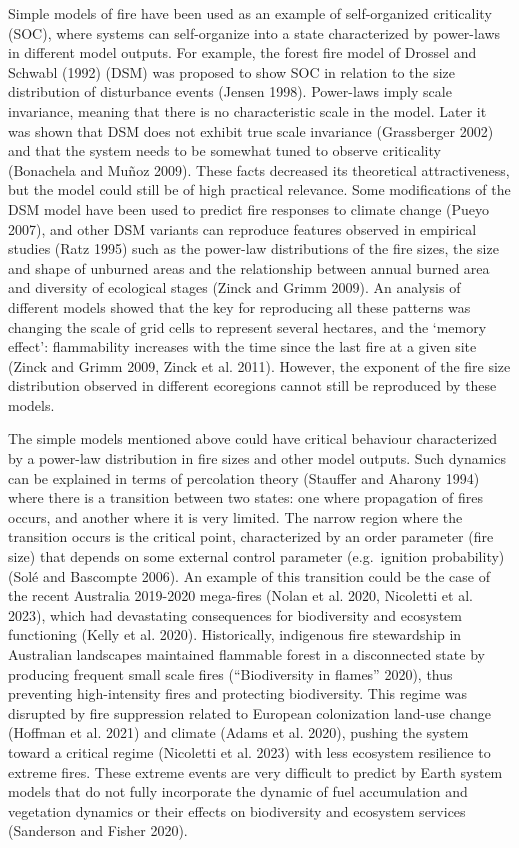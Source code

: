\documentclass[
]{article}
\begin{document}
Simple models of fire have been used as an example of self-organized
criticality (SOC), where systems can self-organize into a state
characterized by power-laws in different model outputs. For example, the
forest fire model of Drossel and Schwabl (1992) (DSM) was proposed to
show SOC in relation to the size distribution of disturbance events
(Jensen 1998). Power-laws imply scale invariance, meaning that there is
no characteristic scale in the model. Later it was shown that DSM does
not exhibit true scale invariance (Grassberger 2002) and that the system
needs to be somewhat tuned to observe criticality (Bonachela and Muñoz
2009). These facts decreased its theoretical attractiveness, but the
model could still be of high practical relevance. Some modifications of
the DSM model have been used to predict fire responses to climate change
(Pueyo 2007), and other DSM variants can reproduce features observed in
empirical studies (Ratz 1995) such as the power-law distributions of the
fire sizes, the size and shape of unburned areas and the relationship
between annual burned area and diversity of ecological stages (Zinck and
Grimm 2009). An analysis of different models showed that the key for
reproducing all these patterns was changing the scale of grid cells to
represent several hectares, and the `memory effect': flammability
increases with the time since the last fire at a given site (Zinck and
Grimm 2009, Zinck et al. 2011). However, the exponent of the fire size
distribution observed in different ecoregions cannot still be reproduced
by these models.

The simple models mentioned above could have critical behaviour
characterized by a power-law distribution in fire sizes and other model
outputs. Such dynamics can be explained in terms of percolation theory
(Stauffer and Aharony 1994) where there is a transition between two
states: one where propagation of fires occurs, and another where it is
very limited. The narrow region where the transition occurs is the
critical point, characterized by an order parameter (fire size) that
depends on some external control parameter (e.g.~ignition probability)
(Solé and Bascompte 2006). An example of this transition could be the
case of the recent Australia 2019-2020 mega-fires (Nolan et al. 2020,
Nicoletti et al. 2023), which had devastating consequences for
biodiversity and ecosystem functioning (Kelly et al. 2020).
Historically, indigenous fire stewardship in Australian landscapes
maintained flammable forest in a disconnected state by producing
frequent small scale fires ({``Biodiversity in flames''} 2020), thus
preventing high-intensity fires and protecting biodiversity. This regime
was disrupted by fire suppression related to European colonization
land-use change (Hoffman et al. 2021) and climate (Adams et al. 2020),
pushing the system toward a critical regime (Nicoletti et al. 2023) with
less ecosystem resilience to extreme fires. These extreme events are
very difficult to predict by Earth system models that do not fully
incorporate the dynamic of fuel accumulation and vegetation dynamics or
their effects on biodiversity and ecosystem services (Sanderson and
Fisher 2020).
\end{document}
